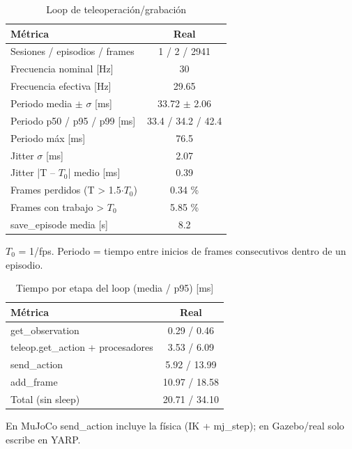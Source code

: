 
\begin{table}[htbp]
\centering\small
\caption{Loop de teleoperación/grabación}
\begin{tabular}{lc}
\toprule
Métrica & Real \\
\midrule
Sesiones / episodios / frames & 1 / 2 / 2941 \\
Frecuencia nominal [Hz] & 30 \\
Frecuencia efectiva [Hz] & 29.65 \\
Periodo media $\pm$ $\sigma$ [ms] & 33.72 $\pm$ 2.06 \\
Periodo p50 / p95 / p99 [ms] & 33.4 / 34.2 / 42.4 \\
Periodo máx [ms] & 76.5 \\
Jitter $\sigma$ [ms] & 2.07 \\
Jitter |T -- $T_0$| medio [ms] & 0.39 \\
Frames perdidos (T > 1.5$\cdot$$T_0$) & 0.34 \% \\
Frames con trabajo > $T_0$ & 5.85 \% \\
save\_episode media [s] & 8.2 \\
\bottomrule
\end{tabular}
\par\footnotesize $T_0$ = 1/fps. Periodo = tiempo entre inicios de frames consecutivos dentro de un episodio.
\end{table}

\begin{table}[htbp]
\centering\small
\caption{Tiempo por etapa del loop (media / p95) [ms]}
\begin{tabular}{lc}
\toprule
Métrica & Real \\
\midrule
get\_observation & 0.29 / 0.46 \\
teleop.get\_action + procesadores & 3.53 / 6.09 \\
send\_action & 5.92 / 13.99 \\
add\_frame & 10.97 / 18.58 \\
Total (sin sleep) & 20.71 / 34.10 \\
\bottomrule
\end{tabular}
\par\footnotesize En MuJoCo send\_action incluye la física (IK + mj\_step); en Gazebo/real solo escribe en YARP.
\end{table}

